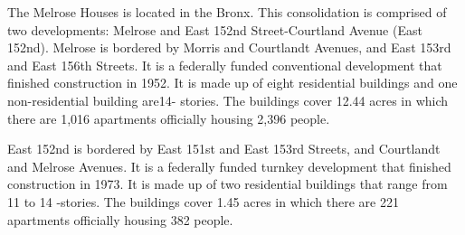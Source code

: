  

The Melrose Houses is located in the Bronx. This consolidation is comprised of two developments: Melrose and East 152nd Street-Courtland Avenue (East 152nd). Melrose is bordered by Morris and Courtlandt Avenues, and East 153rd and East 156th Streets. It is a federally funded conventional development that finished construction in 1952. It is made up of eight residential buildings and one non-residential building are14- stories. The buildings cover 12.44 acres in which there are 1,016 apartments officially housing 2,396 people. 

East 152nd is bordered by East 151st and East 153rd Streets, and Courtlandt and Melrose Avenues. It is a federally funded turnkey development that finished construction in 1973. It is made up of two residential buildings that range from 11 to 14 -stories. The buildings cover 1.45 acres in which there are 221 apartments officially housing 382 people. 